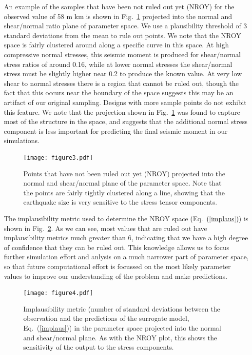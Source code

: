 \documentclass[openacc]{rstransa}%
\begin{document}
An example of the samples that have been not ruled out yet (NROY) for the observed value of 58 m km
is shown in Fig.~\ref{fig_nroy} projected into the normal and shear/normal ratio plane of parameter
space. We use a plausibility threshold of 3 standard deviations from the mean to rule out points.
We note that the NROY space is fairly clustered around along a specific curve in this space.
At high compressive normal stresses, this seismic moment is produced for shear/normal stress ratios
of around 0.16, while at lower normal stresses the shear/normal stress must be slightly higher
near 0.2 to
produce the known value. At very low shear to normal stresses there is a region that cannot be
ruled out, though the fact that this occurs near the boundary of the space suggests this may be
an artifact of our original sampling. Designs with more sample points do not exhibit this feature.
We note that the projection shown in Fig.~\ref{fig_nroy} was found to capture most of the structure
in the space, and suggests that the additional normal
stress component is less important for predicting the final seismic moment in our simulations.

\begin{figure}[!h]
\centering\texttt{[image: figure3.pdf]}
\caption{Points that have not been ruled out yet (NROY) projected into the normal and shear/normal plane of the parameter space. Note that the points are fairly tightly clustered along a line, showing that the earthquake size is very sensitive to the stress tensor components.}
\label{fig_nroy}
\end{figure}

The implausibility metric used to determine the NROY space (Eq.~(\ref{implaus})) is shown in
Fig.~\ref{fig_implausibility}. As we can see, most values that are ruled out have implausibility
metrics much greater than 6, indicating that we have a high degree of confidence that they can be
ruled out. This knowledge allows us to focus further simulation effort and anlysis on a much narrower
part of parameter space, so that future computational effort is focussed on the most likely parameter
values to improve our understanding of the problem and make predictions.

\begin{figure}[!h]
\centering\texttt{[image: figure4.pdf]}
\caption{Implausibility metric (number of standard deviations between the observation and the predictions of the surrogate model, Eq.~(\ref{implaus})) in the parameter space projected into the normal and shear/normal plane. As with the NROY plot, this shows the sensitivity of the output to the stress components.}
\label{fig_implausibility}
\end{figure}
\end{document}
